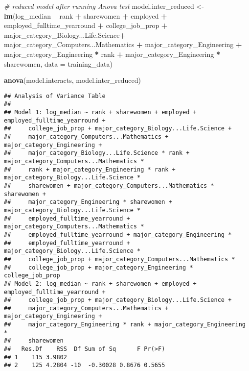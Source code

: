 \documentclass[
]{article}
\newenvironment{Shaded}{\begin{snugshade}}{\end{snugshade}}
\newcommand{\CommentTok}[1]{\textcolor[rgb]{0.56,0.35,0.01}{\textit{#1}}}
\newcommand{\DataTypeTok}[1]{\textcolor[rgb]{0.13,0.29,0.53}{#1}}
\newcommand{\KeywordTok}[1]{\textcolor[rgb]{0.13,0.29,0.53}{\textbf{#1}}}
\newcommand{\NormalTok}[1]{#1}
\newcommand{\OperatorTok}[1]{\textcolor[rgb]{0.81,0.36,0.00}{\textbf{#1}}}
\newcommand{\StringTok}[1]{\textcolor[rgb]{0.31,0.60,0.02}{#1}}
\begin{document}
\begin{Shaded}
\begin{Highlighting}[]
\CommentTok{# reduced model after running Anova test }
\NormalTok{model.inter_reduced <-}\StringTok{ }\KeywordTok{lm}\NormalTok{(log_median }\OperatorTok{~}\StringTok{ }
\StringTok{                        }\NormalTok{rank }\OperatorTok{+}\StringTok{ }\NormalTok{sharewomen }\OperatorTok{+}\StringTok{ }
\StringTok{                        }\NormalTok{employed }\OperatorTok{+}\StringTok{ }\NormalTok{employed_fulltime_yearround }\OperatorTok{+}\StringTok{ }
\StringTok{                        }\NormalTok{college_job_prop }\OperatorTok{+}
\StringTok{                        }\NormalTok{major_category_Biology...Life.Science}\OperatorTok{+}
\StringTok{                        }\NormalTok{major_category_Computers...Mathematics }\OperatorTok{+}\StringTok{ }
\StringTok{                        }\NormalTok{major_category_Engineering }\OperatorTok{+}
\StringTok{                        }\NormalTok{major_category_Engineering }\OperatorTok{*}\StringTok{ }\NormalTok{rank }\OperatorTok{+}
\StringTok{                        }\NormalTok{major_category_Engineering }\OperatorTok{*}\StringTok{ }\NormalTok{sharewomen,  }
                        \DataTypeTok{data =}\NormalTok{ training_data)}
   
\KeywordTok{anova}\NormalTok{(model.interacts, model.inter_reduced)}
\end{Highlighting}
\end{Shaded}

\begin{verbatim}
## Analysis of Variance Table
## 
## Model 1: log_median ~ rank + sharewomen + employed + employed_fulltime_yearround + 
##     college_job_prop + major_category_Biology...Life.Science + 
##     major_category_Computers...Mathematics + major_category_Engineering + 
##     major_category_Biology...Life.Science * rank + major_category_Computers...Mathematics * 
##     rank + major_category_Engineering * rank + major_category_Biology...Life.Science * 
##     sharewomen + major_category_Computers...Mathematics * sharewomen + 
##     major_category_Engineering * sharewomen + major_category_Biology...Life.Science * 
##     employed_fulltime_yearround + major_category_Computers...Mathematics * 
##     employed_fulltime_yearround + major_category_Engineering * 
##     employed_fulltime_yearround + major_category_Biology...Life.Science * 
##     college_job_prop + major_category_Computers...Mathematics * 
##     college_job_prop + major_category_Engineering * college_job_prop
## Model 2: log_median ~ rank + sharewomen + employed + employed_fulltime_yearround + 
##     college_job_prop + major_category_Biology...Life.Science + 
##     major_category_Computers...Mathematics + major_category_Engineering + 
##     major_category_Engineering * rank + major_category_Engineering * 
##     sharewomen
##   Res.Df    RSS  Df Sum of Sq      F Pr(>F)
## 1    115 3.9802                            
## 2    125 4.2804 -10  -0.30028 0.8676 0.5655
\end{verbatim}
\end{document}
